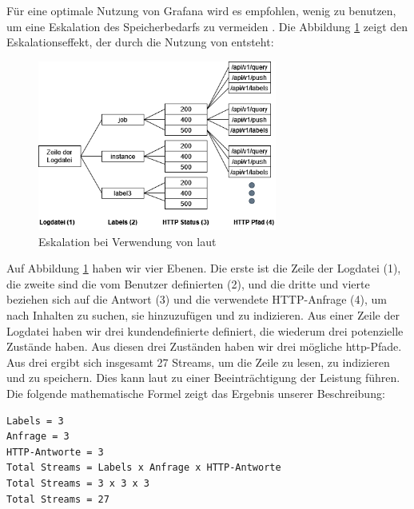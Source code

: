 Für eine optimale Nutzung von Grafana wird es empfohlen, wenig  zu benutzen, um eine Eskalation des Speicherbedarfs zu vermeiden \cite{Grafana_labels}. Die Abbildung \ref{fig:Eskalation_Labels} zeigt den Eskalationseffekt, der durch die Nutzung von  entsteht:

\begin{figure}[H]
   \centering
   \includegraphics[width=0.7\textwidth]{assets/labelstream.png}
   \caption[Eskalation bei Verwendung von ]
   {Eskalation bei Verwendung von  laut \cite{Grafana_labels}}
   \label{fig:Eskalation_Labels}
   \centering
 \end{figure}
 
Auf Abbildung \ref{fig:Eskalation_Labels} haben wir vier Ebenen. Die erste ist die Zeile der Logdatei (1), die zweite sind die vom Benutzer definierten  (2), und die dritte und vierte beziehen sich auf die Antwort (3) und die verwendete HTTP-Anfrage (4), um nach Inhalten zu suchen, sie hinzuzufügen und zu indizieren. Aus einer Zeile der Logdatei haben wir drei kundendefinierte  definiert, die wiederum drei potenzielle Zustände haben. Aus diesen drei Zuständen haben wir drei mögliche \gls{http}-Pfade. Aus drei  ergibt sich insgesamt 27 Streams, um die Zeile zu lesen, zu indizieren und zu speichern. Dies kann laut \cite{Grafana_labels} zu einer Beeinträchtigung der Leistung führen. Die folgende mathematische Formel zeigt das Ergebnis unserer Beschreibung:

{
\begin{Verbatim}[commandchars=\\\{\},frame=single]
Labels = 3
Anfrage = 3
HTTP-Antworte = 3
Total Streams = Labels x Anfrage x HTTP-Antworte
Total Streams = 3 x 3 x 3
Total Streams = 27
\end{Verbatim}
}

